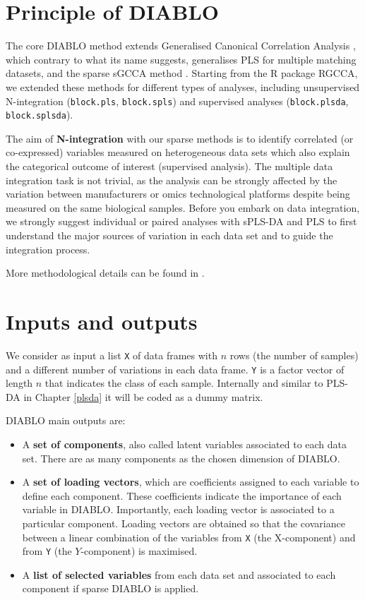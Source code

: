 \documentclass[]{book}
\begin{document}
\hypertarget{principle-of-diablo}{%
\section{Principle of DIABLO}\label{principle-of-diablo}}

The core DIABLO method extends Generalised Canonical Correlation Analysis \citep{Ten11}, which contrary to what its name suggests, generalises PLS for multiple matching datasets, and the sparse sGCCA method \citep{Ten14}. Starting from the R package RGCCA, we extended these methods for different types of analyses, including unsupervised N-integration (\texttt{block.pls}, \texttt{block.spls}) and supervised analyses (\texttt{block.plsda}, \texttt{block.splsda}).

The aim of \textbf{N-integration} with our sparse methods is to identify correlated (or co-expressed) variables measured on heterogeneous data sets which also explain the categorical outcome of interest (supervised analysis). The multiple data integration task is not trivial, as the analysis can be strongly affected by the variation between manufacturers or omics technological platforms despite being measured on the same biological samples. Before you embark on data integration, we strongly suggest individual or paired analyses with sPLS-DA and PLS to first understand the major sources of variation in each data set and to guide the integration process.

More methodological details can be found in \citep{Sin16}.

\hypertarget{inputs-and-outputs-2}{%
\section{Inputs and outputs}\label{inputs-and-outputs-2}}

We consider as input a list \texttt{X} of data frames with \(n\) rows (the number of samples) and a different number of variations in each data frame. \texttt{Y} is a factor vector of length \(n\) that indicates the class of each sample. Internally and similar to PLS-DA in Chapter \ref{plsda} it will be coded as a dummy matrix.

DIABLO main outputs are:

\begin{itemize}
\item
  A \textbf{set of components}, also called latent variables associated to each data set. There are as many components as the chosen dimension of DIABLO.
\item
  A \textbf{set of loading vectors}, which are coefficients assigned to each variable to define each component. These coefficients indicate the importance of each variable in DIABLO. Importantly, each loading vector is associated to a particular component. Loading vectors are obtained so that the covariance between a linear combination of the variables from \texttt{X} (the X-component) and from \texttt{Y} (the \(Y\)-component) is maximised.
\item
  A \textbf{list of selected variables} from each data set and associated to each component if sparse DIABLO is applied.
\end{itemize}
\end{document}
